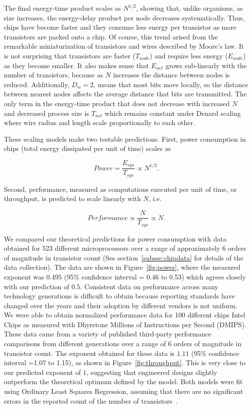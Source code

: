 \documentclass[12pt]{article}
\begin{document}
The final energy-time product scales as $N^{1/2}$, showing that, unlike
organisms, as size increases, the energy-delay product per node decreases
systematically.  Thus, chips have become faster and they consume less energy per
transistor as more transistors are packed onto a chip. Of course, this
trend arised
from the remarkable miniaturization of transistors and wires described by
Moore's law. It is not surprising that transistors are faster ($T_{node}$) and
require less energy ($E_{node}$) as they become smaller. It also makes sense
that  $E_{net}$ grows sub-linearly with the number of transistors, because as
$N$ increases the distance between nodes is reduced. Additionally, $D_w = 2$,
means that most bits move locally, so the distance between nearest nodes
affects the average distance that bits are transmitted.  The only term in the
energy-time product that does not decrease with increased $N$ and decreased
process size is $T_{net}$ which remains constant under Denard scaling where
wire radius and length scale proportionally to each other.

These scaling models make two testable predictions.  First, power
consumption in chips (total energy dissipated per unit of time) scales as

\begin{equation}
\label{eq:Power}
Power = \frac{E_{sys}}{T_{sys}} \propto N^{1/2} .
\end{equation}
 
\noindent Second, performance,
measured as computations executed per unit of time, or throughput, is predicted
to scale linearly with $N$,  i.e.  

\begin{equation}
\label{eq:Performance}
Performance\propto \frac{N}{T_{sys}} \propto N .
\end{equation}

We compared our theoretical predictions for power consumption with data
obtained for 523 different microprocessors over a range of approximately 6
orders of magnitude in transistor count (See section~\ref{subsec:chipdata} for
details of the data collection).  The data are shown in
Figure~\ref{fig:power}, where the measured exponent was $0.495$ (95\%
confidence interval = 0.46 to 0.53) which agrees closely with our prediction of
$0.5$. Consistent data on performance across many technology generations is
difficult to obtain because reporting standards have changed over the years and
their adoption by different vendors is not uniform.  We were able to obtain
normalized performance data for 100 different chips Intel Chips as measured
with Dhyrstone Millions of Instructions per Second (DMIPS). These data came from
a variety of published third-party performance comparisons from different
generations over a range of 6 orders of magnitude in transistor count.  The
exponent obtained for these data is $1.11$ (95\% confidence interval =1.07 to
1.15), as shown in Figure~\ref{fig:throughput}. This is very close to our
predicted exponent of $1$, suggesting that engineered designs slightly
outperform the theoretical optimum defined by the model. Both models were fit
using Ordinary Least Squares Regression, assuming that there
are no significant errors in the reported count of the number of transistors~\cite{mcardle1988structural}.  
\end{document}
